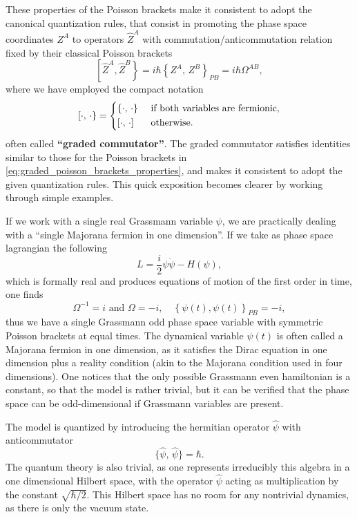 These properties of the Poisson brackets make it consistent to adopt the canonical quantization rules, that consist in promoting the phase space coordinates \(Z^A\) to operators \(\hat{Z}^A\) with commutation/anticommutation relation fixed by their classical Poisson brackets
\begin{equation}
    \left[ \hat{Z}^A, \hat{Z}^B \right\} = i\hbar \left\{Z^{A},\,Z^{B} \right\}_{PB}= i \hbar \Omega^{AB},
    \label{eq:canonical_quantization_mixed_space}
\end{equation}
where we have employed the compact notation
\begin{equation}
    \left[ \cdot,\, \cdot \right\} = \begin{dcases}
        \left\{\cdot,\,\cdot\right\} & \text{ if both variables are fermionic}, \\
        \left[\cdot,\,\cdot\right]   & \text{ otherwise}.
    \end{dcases}
    \label{eq:graded_commutator}
\end{equation}
often called \textbf{“graded commutator”}. The graded commutator satisfies identities similar to those for the Poisson brackets in \eqref{eq:graded_poisson_brackets_properties}, and makes it consistent to adopt the given quantization rules. This quick exposition becomes clearer by working through simple examples.

\begin{example}
    If we work with a single real Grassmann variable \(\psi\), we are practically dealing with a “single Majorana fermion in one dimension”. If we take as phase space lagrangian the following
    \[
        L = \frac{i}{2}\psi\dot{\psi} - H(\psi),
    \]
    which is formally real and produces equations of motion of the first order in time, one finds
    \[
        \Omega^{-1}=i \text{ and } \Omega=-i, \quad \left\{\psi(t), \psi(t)\right\}_{PB} = -i,
    \]
    thus we have a single Grassmann odd phase space variable with symmetric Poisson brackets at equal times. The dynamical variable \(\psi(t)\) is often called a Majorana fermion in one dimension, as it satisfies the Dirac equation in one dimension plus a reality condition (akin to the Majorana condition used in four dimensions).
    One notices that the only possible Grassmann even hamiltonian is a constant, so that the model is rather trivial, but it can be verified that the phase space can be odd-dimensional if Grassmann variables are present.

    The model is quantized by introducing the hermitian operator \(\hat{\psi}\) with anticommutator
    \[
        \{\hat{\psi},\,\hat{\psi}\} = \hbar.
    \]
    The quantum theory is also trivial, as one represents irreducibly this algebra in a one dimensional Hilbert space, with the operator \(\hat{\psi}\) acting as multiplication by the constant \(\sqrt{\hbar/2}\). This Hilbert space has no room for any nontrivial dynamics, as there is only the vacuum state.
\end{example}

